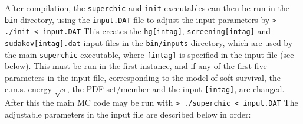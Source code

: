 \documentclass[12pt]{article}
\begin{document}
After compilation, the  \texttt{superchic} and \texttt{init} executables
 can then be run in the \texttt{bin} directory, using the 
 \texttt{input.DAT} file to adjust the input parameters by
\newline
\newline
\texttt{> ./init < input.DAT}
\newline
\newline
This creates the \texttt{hg[intag]}, \texttt{screening[intag]} and 
\texttt{sudakov[intag]}\texttt{.dat} input files in the 
\texttt{bin/inputs} directory, which are used by the main 
\texttt{superchic} executable, where \texttt{[intag]} is specified in 
the input file (see below). This must be run in the first instance, and 
if any of the first five parameters in the input file, corresponding to 
the model of soft survival, the c.m.s. energy $\sqrt{s}$, the PDF 
set/member and the input \texttt{[intag]}, are changed. After this the 
main MC code may be run with
\newline
\newline
\texttt{> ./superchic < input.DAT}
\newline
\newline
The adjustable parameters in the input file are described below in order:
\end{document}
